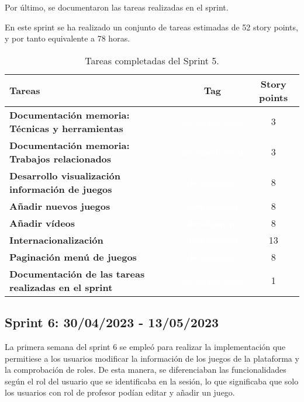 Por último, se documentaron las tareas realizadas en el sprint.

En este sprint se ha realizado un conjunto de tareas estimadas de 52 story points, y por tanto equivalente a 78 horas.

\begin{table}[ht!]
    \centering
    \resizebox{15cm}{!} {
    \begin{tabular}{|l|c|c|}
    \hline
    \rowcolor[rgb]{0.99,0.93,0.93}
    \textbf{Tareas}     &\textbf{Tag}     & \textbf{Story points} \\ \hline
    \textbf{Documentación memoria: Técnicas y herramientas}          &\cellcolor[rgb]{0.0,0.33,0.71}\textcolor{white}{documentation}      &3 \\ \hline 
    \textbf{Documentación memoria: Trabajos relacionados}          &\cellcolor[rgb]{0.0,0.33,0.71}\textcolor{white}{documentation}      &3 \\ \hline 
    \textbf{Desarrollo visualización información de juegos}         &\cellcolor[rgb]{0.99,0.83,0.93}\textcolor{white}{development}      &8 \\ \hline
     \textbf{Añadir nuevos juegos}         &\cellcolor[rgb]{0.99,0.83,0.93}\textcolor{white}{development}      &8 \\ \hline 
    \textbf{Añadir vídeos}         &\cellcolor[rgb]{0.99,0.83,0.93}\textcolor{white}{development}      &8 \\ \hline 
    \textbf{Internacionalización}         &\cellcolor[rgb]{0.99,0.83,0.93}\textcolor{white}{development}      &13 \\ \hline 
    \textbf{Paginación menú de juegos}         &\cellcolor[rgb]{0.99,0.83,0.93}\textcolor{white}{development}      &8 \\ \hline 
    \textbf{Documentación de las tareas realizadas en el sprint}         &\cellcolor[rgb]{0.0,0.33,0.71}\textcolor{white}{documentation}      &1 \\ \hline 
    \end{tabular}}
    \caption{Tareas completadas del Sprint 5.}
    \label{tab:my_label}
\end{table}

\subsection{Sprint 6: 30/04/2023 - 13/05/2023}
La primera semana del sprint 6 se empleó para realizar la implementación que permitiese a los usuarios modificar la información de los juegos de la plataforma y la comprobación de roles. De esta manera, se diferenciaban las funcionalidades según el rol del usuario que se identificaba en la sesión, lo que significaba que solo los usuarios con rol de profesor podían editar y añadir un juego.

